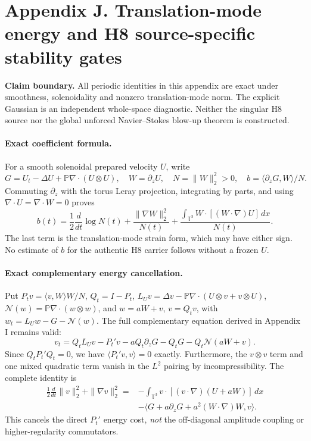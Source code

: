 \clearpage
\section*{Appendix J. Translation-mode energy and H8 source-specific stability gates}
\noindent\textbf{Claim boundary.} All periodic identities in this appendix are exact under smoothness, solenoidality and nonzero translation-mode norm. The explicit Gaussian is an independent whole-space diagnostic. Neither the singular H8 source nor the global unforced Navier--Stokes blow-up theorem is constructed.

\paragraph{Exact coefficient formula.}
For a smooth solenoidal prepared velocity $U$, write
\[
G=U_t-\Delta U+\mathbb P\nabla\cdot(U\otimes U),\quad
W=\partial_zU,\quad N=\|W\|_2^2>0,\quad
b=\langle\partial_zG,W\rangle/N.
\]
Commuting $\partial_z$ with the torus Leray projection, integrating by parts, and using $\nabla\cdot U=\nabla\cdot W=0$ proves
\[
\boxed{\quad
b(t)=\frac12\frac{d}{dt}\log N(t)
+\frac{\|\nabla W\|_2^2}{N(t)}
+\frac{\int_{\mathbb T^3}W\cdot[(W\cdot\nabla)U]\,dx}{N(t)}.
\quad}
\]
The last term is the translation-mode strain form, which may have either sign. No estimate of $b$ for the authentic H8 carrier follows without a frozen $U$.

\paragraph{Exact complementary energy cancellation.}
Put $P_tv=\langle v,W\rangle W/N$, $Q_t=I-P_t$,
$L_Uv=\Delta v-\mathbb P\nabla\cdot(U\otimes v+v\otimes U)$,
$\mathcal N(w)=\mathbb P\nabla\cdot(w\otimes w)$, and
$w=aW+v$, $v=Q_tv$, with $w_t=L_Uw-G-\mathcal N(w)$.
The full complementary equation derived in Appendix I remains valid:
\[
v_t=Q_tL_Uv-P_t'v-aQ_t\partial_zG-Q_tG-Q_t\mathcal N(aW+v).
\]
Since $Q_tP_t'Q_t=0$, we have $\langle P_t'v,v\rangle=0$ exactly.
Furthermore, the $v\otimes v$ term and one mixed quadratic term
vanish in the $L^2$ pairing by incompressibility. The complete identity is
\[
\boxed{\begin{aligned}
\frac12\frac{d}{dt}\|v\|_2^2+\|\nabla v\|_2^2
={}&-\int_{\mathbb T^3}v\cdot[(v\cdot\nabla)(U+aW)]\,dx\\
&-\langle G+a\partial_zG+a^2(W\cdot\nabla)W,v\rangle.
\end{aligned}}
\]
This cancels the direct $P_t'$ energy cost, \emph{not} the off-diagonal amplitude coupling or higher-regularity commutators.

